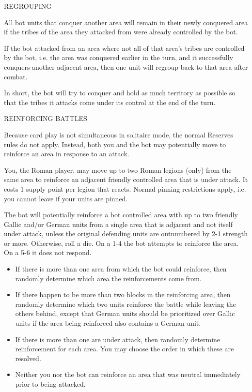 \label{solitaire:regrouping}REGROUPING

All bot units that conquer another area will remain in their newly conquered area if the tribes of the area they attacked from were already controlled by the bot.
    
If the bot attacked from an area where not all of that area's tribes are controlled by the bot, i.e. the area was conquered earlier in the turn, and it successfully conquers another adjacent area, then one unit will regroup back to that area after combat.
    
In short, the bot will try to conquer and hold as much territory as possible so that the tribes it attacks come under its control at the end of the turn.
  
\label{solitaire:reinforcing_battles}REINFORCING BATTLES
  
Because card play is not simultaneous in solitaire mode, the normal Reserves rules do not apply. Instead, both you and the bot may potentially move to reinforce an area in response to an attack.
  
You, the Roman player, may move up to two Roman legions (only) from the same area to reinforce an adjacent friendly controlled area that is under attack. It costs 1 supply point per legion that reacts. Normal pinning restrictions apply, i.e. you cannot leave if your units are pinned.
    
The bot will potentially reinforce a bot controlled area with up to two friendly Gallic and/or German units from a single area that is adjacent and not itself under attack, unless the original defending units are outnumbered by 2-1 strength or more. Otherwise, roll a die. On a 1-4 the bot attempts to reinforce the area. On a 5-6 it does not respond.

\begin{itemize}
  \item If there is more than one area from which the bot could reinforce, then randomly determine which area the reinforcements come from.
    
  \item If there happen to be more than two blocks in the reinforcing area, then randomly determine which two units reinforce the battle while leaving the others behind, except that German units should be prioritized over Gallic units if the area being reinforced also contains a German unit.
    
  \item If there is more than one are under attack, then randomly determine reinforcement for each area. You may choose the order in which these are resolved.
    
  \item Neither you nor the bot can reinforce an area that was neutral immediately prior to being attacked.
\end{itemize}
  
